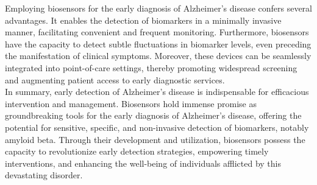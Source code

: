 Employing biosensors for the early diagnosis of Alzheimer's disease confers several advantages. 
It enables the detection of biomarkers in a minimally invasive manner, 
facilitating convenient and frequent monitoring\cite{wang2005}. 
Furthermore, 
biosensors have the capacity to detect subtle fluctuations in biomarker levels, 
even preceding the manifestation of clinical symptoms\cite{batool2019}. 
Moreover, 
these devices can be seamlessly integrated into point-of-care settings, 
thereby promoting widespread screening and augmenting patient access to early diagnostic services\cite{ding2018}.\\

In summary, 
early detection of Alzheimer's disease is indispensable for efficacious intervention and management. 
Biosensors hold immense promise as groundbreaking tools for the early diagnosis of Alzheimer's disease, 
offering the potential for sensitive, 
specific, 
and non-invasive detection of biomarkers, 
notably amyloid beta\cite{janson2004}. 
Through their development and utilization, 
biosensors possess the capacity to revolutionize early detection strategies, 
empowering timely interventions, 
and enhancing the well-being of individuals afflicted by this devastating disorder\cite{kumar2018}.\\
